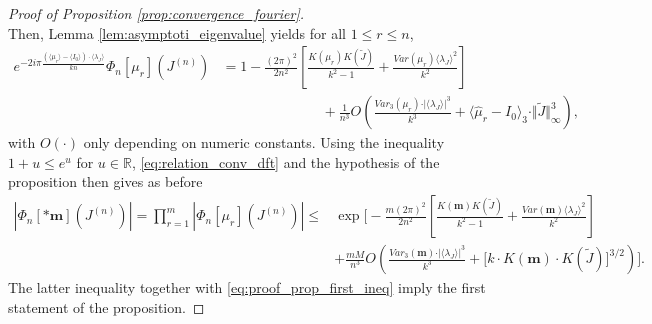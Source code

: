 \documentclass[10pt,11pt]{amsart}%
\begin{document}
\begin{proof}[Proof of Proposition \ref{prop:convergence_fourier}]
\begin{equation}
\end{equation}
Then, Lemma \ref{lem:asymptoti_eigenvalue} yields for all $1\leq r\leq n$,
\begin{align*}
e^{-2i\pi\frac{(\langle\mu_r\rangle-\langle I_0\rangle)\cdot\langle \lambda_J\rangle}{kn}}\Phi_{n}[\mu_r](J^{(n)})&=1-\frac{(2\pi)^2}{2n^2}\left[\frac{K(\mu_r)K(\tilde{J})}{k^2-1}+\frac{Var(\mu_r)\langle \lambda_J\rangle^2}{k^2}\right]\\
&\hspace{3cm}+\frac{1}{n^3}O\left(\frac{Var_3(\mu_r)\cdot\vert\langle \lambda_J\rangle\vert^3}{k^3}+\langle\hat{\mu}_r-I_0\rangle_3\cdot\Vert \tilde{J}\Vert_\infty^3\right),
\end{align*}
with $O(\cdot)$ only depending on numeric constants. Using the inequality $1+u\leq e^{u}$ for $u\in \mathbb{R}$, \eqref{eq:relation_conv_dft} and the hypothesis of the proposition then gives as before 
\begin{align*}
\left\vert\Phi_{n}[*\mathbf{m}](J^{(n)})\right\vert=\prod_{r=1}^m\left\vert \Phi_{n}[\mu_r](J^{(n)})\right\vert\leq&\exp\Bigg[-\frac{m(2\pi)^2}{2n^2}\left[\frac{K(\mathbf{m})K(\tilde{J})}{k^2-1}+\frac{Var(\mathbf{m})\langle \lambda_J\rangle^2}{k^2}\right]\\
&+\frac{mM}{n^3}O\left(\frac{Var_3(\mathbf{m})\cdot\vert\langle \lambda_J\rangle\vert^3}{k^3}+\Big[k \cdot K(\mathbf{m})\cdot K(\tilde{J})\Big]^{3/2}\right)\Bigg].
\end{align*}
The latter inequality together with \eqref{eq:proof_prop_first_ineq} imply the first statement of the proposition.



\end{proof}
\end{document}
